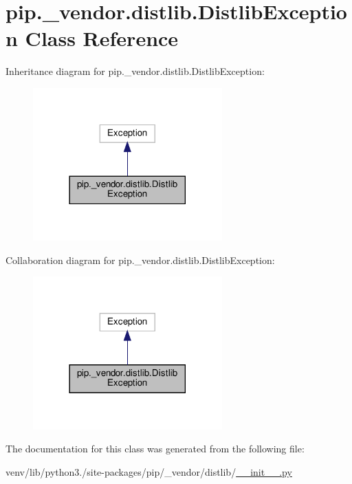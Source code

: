 \hypertarget{classpip_1_1__vendor_1_1distlib_1_1DistlibException}{}\section{pip.\+\_\+vendor.\+distlib.\+Distlib\+Exception Class Reference}
\label{classpip_1_1__vendor_1_1distlib_1_1DistlibException}


Inheritance diagram for pip.\+\_\+vendor.\+distlib.\+Distlib\+Exception\+:
\nopagebreak
\begin{figure}[H]
\begin{center}
\leavevmode
\includegraphics[width=206pt]{classpip_1_1__vendor_1_1distlib_1_1DistlibException__inherit__graph}
\end{center}
\end{figure}


Collaboration diagram for pip.\+\_\+vendor.\+distlib.\+Distlib\+Exception\+:
\nopagebreak
\begin{figure}[H]
\begin{center}
\leavevmode
\includegraphics[width=206pt]{classpip_1_1__vendor_1_1distlib_1_1DistlibException__coll__graph}
\end{center}
\end{figure}


The documentation for this class was generated from the following file\+:\begin{DoxyCompactItemize}
\item 
venv/lib/python3./site-\/packages/pip/\+\_\+vendor/distlib/\hyperlink{venv_2lib_2python3_89_2site-packages_2pip_2__vendor_2distlib_2____init_____8py}{\+\_\+\+\_\+init\+\_\+\+\_\+.\+py}\end{DoxyCompactItemize}
